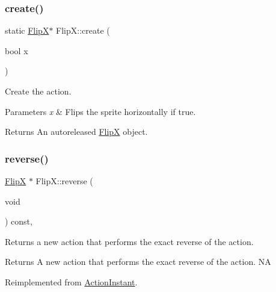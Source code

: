 \subsubsection{\texorpdfstring{create()}{create()}\hspace{0.1cm}{\footnotesize\ttfamily [2/2]}}
{\footnotesize\ttfamily static \hyperlink{classFlipX}{FlipX}$\ast$ Flip\+X\+::create (\begin{DoxyParamCaption}\item[{bool}]{x }\end{DoxyParamCaption})\hspace{0.3cm}{\ttfamily [static]}}

Create the action.


\begin{DoxyParams}{Parameters}
{\em x} & Flips the sprite horizontally if true. \\
\hline
\end{DoxyParams}
\begin{DoxyReturn}{Returns}
An autoreleased \hyperlink{classFlipX}{FlipX} object. 
\end{DoxyReturn}
\mbox{\label{classFlipX_af626c89fa9e3c2881fe52a48eecef17d}} 
\subsubsection{\texorpdfstring{reverse()}{reverse()}\hspace{0.1cm}{\footnotesize\ttfamily [1/2]}}
{\footnotesize\ttfamily \hyperlink{classFlipX}{FlipX} $\ast$ Flip\+X\+::reverse (\begin{DoxyParamCaption}\item[{void}]{ }\end{DoxyParamCaption}) const\hspace{0.3cm}{\ttfamily [override]}, {\ttfamily [virtual]}}

Returns a new action that performs the exact reverse of the action.

\begin{DoxyReturn}{Returns}
A new action that performs the exact reverse of the action.  NA 
\end{DoxyReturn}


Reimplemented from \hyperlink{classActionInstant_aeb1870802c509e1f4111c863a28e9262}{Action\+Instant}.

\mbox{\label{classFlipX_a73b5cd89de0852721c49506eb02046ba}} 
